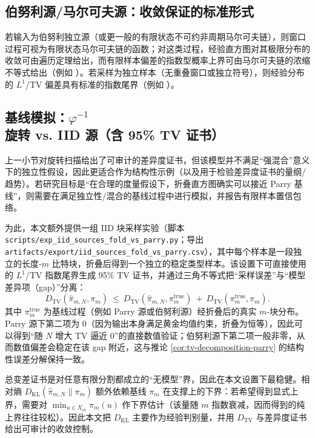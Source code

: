 \subsection{伯努利源/马尔可夫源：收敛保证的标准形式}

\begin{remark}[伯努利源的极限与有限样本界的引用口径]\label{rem:bernoulli-source-guarantee}
若输入为伯努利独立源（或更一般的有限状态不可约非周期马尔可夫链），则窗口过程可视为有限状态马尔可夫链的函数；对这类过程，经验直方图对其极限分布的收敛可由遍历定理给出，而有限样本偏差的指数型概率上界可由马尔可夫链的浓缩不等式给出（例如 \cite{Paulin2015MarkovConcentration}）。若采样为独立样本（无重叠窗口或独立符号），则经验分布的 $L^1$/TV 偏差具有标准的指数尾界（例如 \cite{WeissmanEtAl2003L1Empirical}）。
\end{remark}

\subsection{基线模拟：\texorpdfstring{$\varphi^{-1}$}{phi} 旋转 vs. IID 源（含 95\% TV 证书）}\label{subsec:exp-iid-baselines}
上一小节对旋转扫描给出了可审计的差异度证书，但该模型并不满足“强混合”意义下的独立性假设，因此更适合作为结构性示例（以及用于检验差异度证书的量纲/趋势）。若研究目标是“在合理的度量假设下，折叠直方图确实可以接近 Parry 基线”，则需要在满足独立性/混合的基线过程中进行模拟，并报告有限样本置信包络。

为此，本文额外提供一组 IID 块采样实验（脚本 \texttt{scripts/exp\_iid\_sources\_fold\_vs\_parry.py}；导出 \texttt{artifacts/export/iid\_sources\_fold\_vs\_parry.csv}），其中每个样本是一段独立的长度-$m$ 比特块，折叠后得到一个独立的稳定类型样本。该设置下可直接使用 \cite{WeissmanEtAl2003L1Empirical} 的 $L^1$/TV 指数尾界生成 95\% TV 证书，并通过三角不等式把“采样误差”与“模型差异项（gap）”分离：
\[
D_{\mathrm{TV}}(\hat{\pi}_{m,N},\pi_m)\ \le\ D_{\mathrm{TV}}(\hat{\pi}_{m,N},\pi_m^{\mathrm{true}})\ +\ D_{\mathrm{TV}}(\pi_m^{\mathrm{true}},\pi_m).
\]
其中 $\pi_m^{\mathrm{true}}$ 为基线过程（例如 Parry 源或伯努利源）经折叠后的真实 $m$-块分布。Parry 源下第二项为 $0$（因为输出本身满足黄金均值约束，折叠为恒等），因此可以得到“随 $N$ 增大 TV 逼近 0”的直接数值验证；伯努利源下第二项一般非零，从而数值偏差会稳定在该 gap 附近，这与推论 \ref{cor:tv-decomposition-parry} 的结构性误差分解保持一致。




\begin{remark}
总变差证书是对任意有限分割都成立的“无模型”界，因此在本文设置下最稳健。相对熵 $D_{\mathrm{KL}}(\hat{\pi}_{m,N}\|\pi_m)$ 额外依赖基线 $\pi_m$ 在支撑上的下界：若希望得到显式上界，需要对 $\min_{u\in X_m}\pi_m(u)$ 作下界估计（该量随 $m$ 指数衰减，因而得到的纯上界往往较松）。因此本文把 $D_{\mathrm{KL}}$ 主要作为经验判别量，并用 $D_{\mathrm{TV}}$ 与差异度证书给出可审计的收敛控制。
\end{remark}

